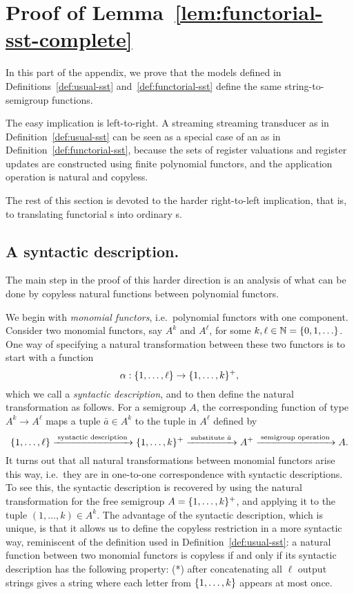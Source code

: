 \section{Proof of Lemma~\ref{lem:functorial-sst-complete}}
In this part of the appendix, we prove that the models defined in Definitions~\ref{def:usual-sst} and~\ref{def:functorial-sst} define the same string-to-semigroup functions.

The easy implication is left-to-right. 
    A streaming streaming transducer as in Definition~\ref{def:usual-sst} can be seen as a special case of an \sst as in Definition~\ref{def:functorial-sst}, because the sets of register valuations and register updates are constructed using finite polynomial functors, and the application operation is natural and copyless. 

The rest of this section is devoted to the harder right-to-left implication, that is, to translating functorial \sst{}s into ordinary \sst{}s.

\subsection{A syntactic description.}

The main step in the proof of this harder direction is an analysis of what can be done by copyless natural functions between polynomial functors.

We begin with \emph{monomial functors}, i.e.~polynomial functors with one component. 
Consider two monomial functors, say $A^k$ and $A^\ell$, for some  $k,\ell \in \mathbb{N} = \{0,1,\ldots\}$.
One way of specifying a natural transformation between these two functors is to start with a function 
\begin{equation}
\label{eq:syntactic-description}    \alpha : \{1,\ldots,\ell\} \to \{1,\ldots,k\}^+,
\end{equation}
which we call a \emph{syntactic description}, and to then  define the  natural transformation as follows. For a semigroup $A$, the corresponding function of type $A^k \to A^\ell$  maps a tuple $\bar a \in A^k$ to the tuple in $A^\ell$ defined by
\[
\{1,\ldots,\ell\}
\xrightarrow{\;\text{syntactic description}\;}
\{1,\ldots,k\}^+ 
\xrightarrow{\;\text{substitute $\bar a$}\;}
A^+
\xrightarrow{\;\text{semigroup operation}\;}
A.
\]
It turns out that all  natural transformations between monomial functors arise this way, i.e.~they are in one-to-one correspondence with syntactic descriptions. To see this, the syntactic description is recovered by using the natural transformation for the free semigroup $A=\{1,\ldots,k\}^+$, and applying it to the tuple $(1,\ldots,k) \in A^k$.
The advantage of the syntactic description, which is unique, is that it allows us to define the  {copyless restriction} in a more syntactic way, reminiscent of the definition used in Definition~\ref{def:usual-sst}:  a natural function between two monomial functors is copyless if and only if its syntactic description has the following property: (*) after concatenating all $\ell$ output strings gives a string where each letter from $\{1,\ldots,k\}$ appears at most once. 

